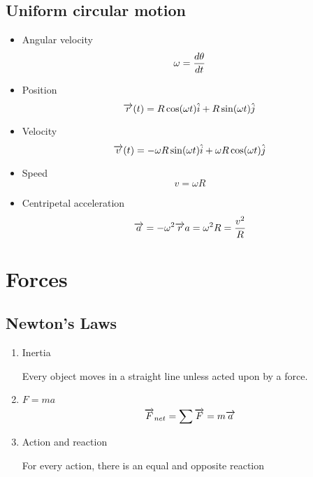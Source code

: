     \subsection{Uniform circular motion}
        \begin{itemize}
            \item Angular velocity
                \begin{equation}
                    \omega=\dfrac{d\theta}{dt}
                \end{equation}
            \item Position
                \begin{equation}
                    \overrightarrow{r}(t) = R\cos(\omega t)\hat{i}+R\sin(\omega t) \hat{j}
                \end{equation}
            \item Velocity
                \begin{equation}
                    \overrightarrow{v}(t)=-\omega R\sin(\omega t)\hat{i}+\omega R\cos(\omega t)\hat{j}
                \end{equation}
            \item Speed
                \begin{equation}
                    v=\omega R
                \end{equation}
            \item Centripetal acceleration
                \begin{equation}
                    \overrightarrow{a}=-\omega^2\overrightarrow{r} \\
                    a=\omega^2R=\frac{v^2}{R}
                \end{equation}
        \end{itemize}
\section{Forces}
    \subsection{Newton's Laws}
        \begin{enumerate}
            \item Inertia
                \begin{center}
                    Every object moves in a straight line unless acted upon by a force.
                \end{center}
            \item $F=ma$
                \begin{equation}
                    \overrightarrow{F}_{net}=\sum \overrightarrow{F}=m\overrightarrow{a}
                \end{equation}
            \item Action and reaction
                \begin{center}
                    For every action, there is an equal and opposite reaction
                \end{center}
        \end{enumerate}
